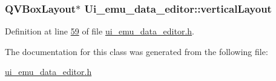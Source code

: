 \hypertarget{a00026_a11b9c1ae90724f0bcd67c76045c93704}{
\subsubsection[{vertical\+Layout}]{\setlength{\rightskip}{0pt plus 5cm}Q\+V\+Box\+Layout$\ast$ Ui\+\_\+emu\+\_\+data\+\_\+editor\+::vertical\+Layout}}\label{a00026_a11b9c1ae90724f0bcd67c76045c93704}


Definition at line \hyperlink{a00051_source_l00059}{59} of file \hyperlink{a00051_source}{ui\+\_\+emu\+\_\+data\+\_\+editor.\+h}.



The documentation for this class was generated from the following file\+:\begin{DoxyCompactItemize}
\item 
\hyperlink{a00051}{ui\+\_\+emu\+\_\+data\+\_\+editor.\+h}\end{DoxyCompactItemize}
